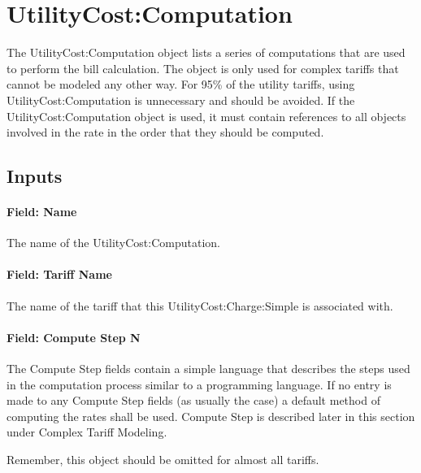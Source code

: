 \section{UtilityCost:Computation}\label{utilitycostcomputation}

The UtilityCost:Computation object lists a series of computations that are used to perform the bill calculation. The object is only used for complex tariffs that cannot be modeled any other way. For 95\% of the utility tariffs, using UtilityCost:Computation is unnecessary and should be avoided. If the UtilityCost:Computation object is used, it must contain references to all objects involved in the rate in the order that they should be computed.

\subsection{Inputs}\label{inputs-069}

\paragraph{Field: Name}\label{field-name-062}

The name of the UtilityCost:Computation.

\paragraph{Field: Tariff Name}\label{field-tariff-name-001}

The name of the tariff that this UtilityCost:Charge:Simple is associated with.

\paragraph{Field: Compute Step N}\label{field-compute-step-n}

The Compute Step fields contain a simple language that describes the steps used in the computation process similar to a programming language. If no entry is made to any Compute Step fields (as usually the case) a default method of computing the rates shall be used. Compute Step is described later in this section under Complex Tariff Modeling.

Remember, this object should be omitted for almost all tariffs.
